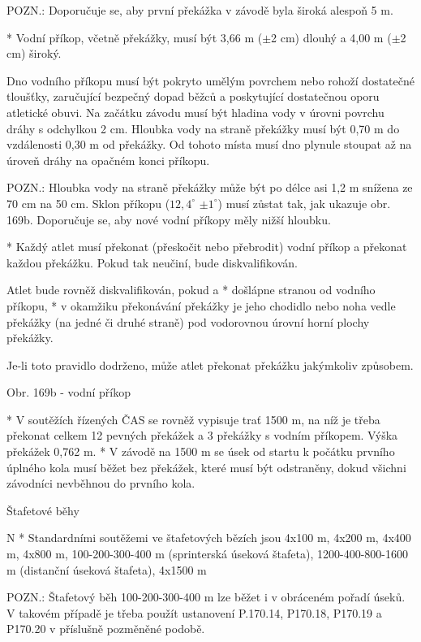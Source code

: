 POZN.:  Doporučuje se, aby první překážka v závodě byla široká alespoň 5 m.

* Vodní příkop, včetně překážky, musí být 3,66 m ($\pm$2 cm) dlouhý a 4,00 m ($\pm$2 cm) široký.

Dno vodního příkopu musí být pokryto umělým povrchem nebo rohoží dostatečné tloušťky, zaručující bezpečný dopad běžců a poskytující dostatečnou oporu atletické obuvi. Na začátku závodu musí být hladina vody v úrovni povrchu dráhy s odchylkou 2 cm. Hloubka vody na straně překážky musí být 0,70 m do vzdálenosti 0,30 m od překážky. Od tohoto místa musí dno plynule stoupat až na úroveň dráhy na opačném konci příkopu.

POZN.: Hloubka vody na straně překážky může být po délce asi 1,2 m snížena ze 70 cm na 50 cm. Sklon příkopu ($12,4^\circ$ $\pm1^\circ$) musí zůstat tak, jak ukazuje obr. 169b. Doporučuje se, aby nové vodní příkopy měly nižší hloubku.

* Každý atlet musí překonat (přeskočit nebo přebrodit) vodní příkop a překonat každou překážku. Pokud tak neučiní, bude diskvalifikován.

Atlet bude rovněž diskvalifikován, pokud
  \begitems \style a
  * došlápne stranou od vodního příkopu,
  * v okamžiku překonávání překážky je jeho chodidlo nebo noha vedle překážky (na jedné či druhé straně) pod vodorovnou úrovní horní plochy překážky.
  \enditems

Je-li toto pravidlo dodrženo, může atlet překonat překážku jakýmkoliv způsobem.

Obr. 169b - vodní příkop

* V soutěžích řízených ČAS se rovněž vypisuje trať 1500 m, na níž je třeba překonat celkem 12 pevných překážek a 3 překážky s vodním příkopem. Výška překážek 0,762 m.
* V závodě na 1500 m se úsek od startu k počátku prvního úplného kola musí běžet bez překážek, které musí být odstraněny, dokud všichni závodníci nevběhnou do prvního kola.
\enditems

\secc Štafetové běhy

\begitems \style N
* Standardními soutěžemi ve štafetových bězích jsou 4x100 m, 4x200 m, 4x400 m, 4x800 m, 100-200-300-400 m (sprinterská úseková štafeta), 1200-400-800-1600 m (distanční úseková štafeta), 4x1500 m

POZN.: Štafetový běh 100-200-300-400 m lze běžet i v obráceném pořadí úseků. V takovém případě je třeba použít ustanovení P.170.14, P170.18, P170.19 a P170.20 v příslušně pozměněné podobě.

